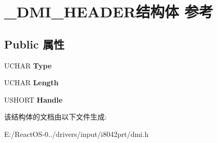 \hypertarget{struct___d_m_i___h_e_a_d_e_r}{}\section{\+\_\+\+D\+M\+I\+\_\+\+H\+E\+A\+D\+E\+R结构体 参考}
\label{struct___d_m_i___h_e_a_d_e_r}
\subsection*{Public 属性}
\begin{DoxyCompactItemize}
\item 
\mbox{\label{struct___d_m_i___h_e_a_d_e_r_a5cadd3a7c85dda890dc76ae6c8f3681e}} 
U\+C\+H\+AR {\bfseries Type}
\item 
\mbox{\label{struct___d_m_i___h_e_a_d_e_r_ab01106284b477b4c92540f670986832a}} 
U\+C\+H\+AR {\bfseries Length}
\item 
\mbox{\label{struct___d_m_i___h_e_a_d_e_r_a50080ec2475af7ebfd5305a08d5c15d7}} 
U\+S\+H\+O\+RT {\bfseries Handle}
\end{DoxyCompactItemize}


该结构体的文档由以下文件生成\+:\begin{DoxyCompactItemize}
\item 
E\+:/\+React\+O\+S-\/0../drivers/input/i8042prt/dmi.\+h\end{DoxyCompactItemize}
